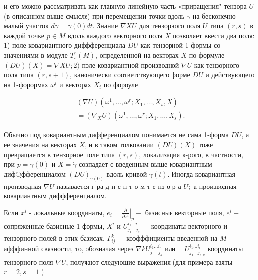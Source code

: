 \documentclass[10pt]{article}
\begin{document}
и его можно рассматривать как главную линейную часть «приращения" тензора $U$ (в описанном выше смысле) при перемещении точки вдоль $\gamma$ на бесконечно малый участок $d \gamma=\dot{\gamma}(0) d t$. Знание $\nabla X U$ для тензорного поля $U$ типа $(r, s)$ в каждой точке $p \in M$ вдоль каждого векторного поля $X$ позволяет ввести два поля: 1) поле ковариантного диффференциала $D U$ как тензорной 1-формы со значениями в модуле $T_{s}^{r}(M)$, определенной на векторах $X$ по формуле $(D U)(X)=\nabla X U ; 2)$ поле ковариантной производной $\nabla U$ как тензорного поля типа $(r, s+1)$, канонически соответствующего форме $D U$ и действующего на 1-форормах $\omega^{i}$ и векторах $X_{i}$ по фороуле



\[

\begin{aligned}

& (\nabla U)\left(\omega^{1}, \ldots, \omega^{r} ; X_{1}, \ldots, X_{s}, X\right)= \\

& =\left(\nabla_{X} U\right)\left(\omega^{1}, \ldots, \omega^{r} ; X_{1}, \ldots, X_{s}\right) .

\end{aligned}

\]



Обычно под ковариантным дифференциалом понимается не сама 1-форма $D U$, а ее значения на векторах $X$, и в таком толковании $(D U)(X)$ тоже превращается в тензорное поле типа $(r, s)$, локализация к-рого, в частности, при $p=\gamma(0)$ и $X=\dot{\gamma}$ совпадает с введенным выше ковариантным диф্фференциалом $(D U)_{\gamma(0)}$ вдоль кривой $\gamma(t)$. Иногда ковариантная производная $\nabla U$ называется г ра д и е н т о м т е нз о р а $U ;$ а производная ковариантным диффференциалом.



Если $x^{i}$ - локальные координаты, $e_{i}=\left.\frac{\partial}{\partial x^{i}}\right|_{p}-$ базисные векторные поля, $e^{i}-$ сопряженные базисные 1-формы, $X^{i}$ и $U_{j_{1} \ldots j_{s}}^{i_{1} \ldots i}-$ координаты векторного и тензорного полей в этих базисах, $\Gamma_{i j}^{k}-$ коэфффициенты введенной на $M$ афффинной связности, то, обозначая через $\nabla k U_{j_{1} \ldots j_{s}}^{i_{1} \ldots i_{r}}$ или $\quad U_{j_{1} \ldots j_{s, k}}^{i_{1} \ldots i_{r}}$ координаты тензорного поля $\nabla U$, получают следующие выражения (для примера взяты $r=2, s=1$ )
\end{document}
